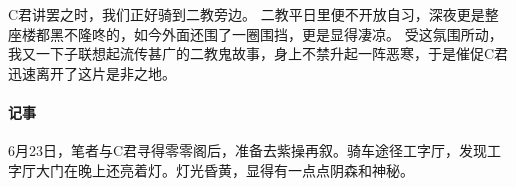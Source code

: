 
C君讲罢之时，我们正好骑到二教旁边。
二教平日里便不开放自习，深夜更是整座楼都黑不隆咚的，如今外面还围了一圈围挡，更是显得凄凉。
受这氛围所动，我又一下子联想起流传甚广的二教鬼故事，身上不禁升起一阵恶寒，于是催促C君迅速离开了这片是非之地。

\vfill

\paragraph{记事}
6月23日，笔者与C君寻得零零阁后，准备去紫操再叙。骑车途径工字厅，发现工字厅大门在晚上还亮着灯。灯光昏黄，显得有一点点阴森和神秘。
